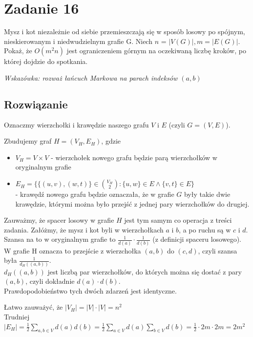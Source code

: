 \section{Zadanie 16}

Mysz i kot niezależnie od siebie przemieszczają się w sposób losowy po
spójnym, nieskierowanym i niedwudzielnym grafie G.
Niech \(n\) = \( |V(G)|, m = |E(G)| \). Pokaż, że \(O(m^2n)\) jest
ograniczeniem górnym na oczekiwaną liczbę kroków, po której dojdzie do
spotkania.

\textit{Wskazówka: rozważ łańcuch Markowa na parach indeksów
	\((a, b)\)}

\subsection*{Rozwiązanie}

Oznaczmy wierzchołki i krawędzie naszego grafu \(V\) i \(E\)
(czyli \(G = (V, E)\)).

Zbudujemy graf \(H = (V_H, E_H)\), gdzie
\begin{itemize}
	\item \(V_H = V \times V\) - wierzchołek nowego grafu będzie parą
	      wierzchołków w oryginalnym grafie
	\item \(E_H = \big\{\{(u, v), (w, t)\} \in \binom{V_H}{2} \colon
	      \{u, w\} \in E \land \{v, t\} \in E
	      \big\}\)
	      \\- krawędź nowego grafu będzie oznaczała, że w grafie \(G\) były takie
	      dwie krawędzie, którymi można było przejść z jednej pary wierzchołków
	      do drugiej.
\end{itemize}
Zauważmy, że spacer losowy w grafie \(H\) jest tym samym co operacja
z treści zadania.
Załóżmy, że mysz i kot byli w wierzchołkach \(a\) i \(b\), a po
ruchu są w \(c\) i \(d\). Szansa na to w oryginalnym grafie to
\(\frac{1}{d(a)}\cdot\frac{1}{d(b)}\) (z definicji spaceru losowego).
\\W grafie
H oznacza to przejście z wierzchołka \((a, b)\) do \((c, d)\),
czyli szansa była \(\frac{1}{d_H((a,b))}\).\\
\(d_H((a, b))\) jest liczbą par wierzchołków, do których można się
dostać z pary \((a, b)\), czyli dokładnie \(d(a)\cdot d(b)\).\\
Prawdopodobieństwo tych dwóch zdarzeń jest identyczne.

Łatwo zauważyć, że \(|V_H| = |V| \cdot |V| = n^2\)\\
Trudniej \(|E_H| = \frac{1}{2} \sum_{a, b \in V} d(a)d(b)
= \frac{1}{2} \sum_{a \in V} d(a) \sum_{b \in V} d(b)
= \frac{1}{2} \cdot 2m \cdot 2m = 2m^2
\)

